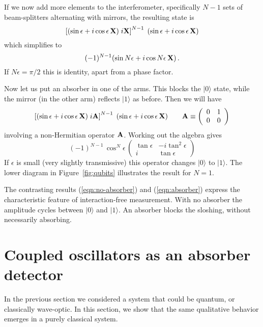 \documentclass[12pt,aps,prb,preprint]{revtex4}
\def\ket#1{|#1\rangle}
\def\X{{\bf X}}
\def\A{{\bf A}}
\begin{document}
If we now add more elements to the interferometer, specifically $N-1$
sets of beam-splitters alternating with mirrors, the resulting state
is
\begin{equation}
     \left[ (\sin\epsilon + i\cos\epsilon\,\X) \; i\X \right]^{N-1} \;
     (\sin\epsilon + i\cos\epsilon\,\X)
\end{equation}
which simplifies to
\begin{equation}
     (-1)^{N-1} (\sin N\epsilon + i\cos N\epsilon\,\X)  \,.
\end{equation}
If $N\epsilon=\pi/2$ this is identity, apart from a phase factor.

Now let us put an absorber in one of the arms.  This blocks the
$\ket0$ state, while the mirror (in the other arm) reflects $\ket1$ as
before.  Then we will have
\begin{equation}
     \left[ (\sin\epsilon + i\cos\epsilon\,\X) \; i\A \right]^{N-1} \;
     (\sin\epsilon + i\cos\epsilon\,\X)
  \qquad
   \A \equiv \left( \begin{array}{cc} 0 & 1 \\ 0 & 0 \end{array} \right)
\end{equation}
involving a non-Hermitian operator $\A$.  Working out the algebra
gives
\begin{equation}
(-1)^{N-1} \, \cos^N\!\epsilon \,
\left( \begin{array}{cc} \tan\epsilon & -i\tan^2\epsilon \\
                         i            & \tan\epsilon 
       \end{array} \right)
\label{eqn:absorber}
\end{equation}
If $\epsilon$ is small (very slightly transmissive) this operator
changes $\ket0$ to $\ket1$.  The lower diagram in
Figure~\ref{fig:qubits} illustrates the result for $N=1$.

The contrasting results (\ref{eqn:no-absorber}) and
(\ref{eqn:absorber}) express the characteristic feature of
interaction-free measurement.  With no absorber the amplitude cycles
between $\ket0$ and $\ket1$.  An absorber blocks the sloshing, without
necessarily absorbing.

\section{Coupled oscillators as an absorber detector}\label{sec:oscill}

In the previous section we considered a system that could be quantum,
or classically wave-optic.  In this section, we show that the same
qualitative behavior emerges in a purely classical system.
\end{document}
